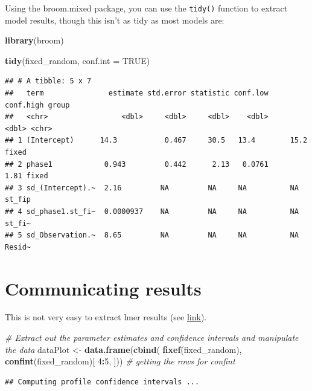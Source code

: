 \documentclass[]{book}
\newenvironment{Shaded}{\begin{snugshade}}{\end{snugshade}}
\newcommand{\KeywordTok}[1]{\textcolor[rgb]{0.13,0.29,0.53}{\textbf{#1}}}
\newcommand{\DataTypeTok}[1]{\textcolor[rgb]{0.13,0.29,0.53}{#1}}
\newcommand{\DecValTok}[1]{\textcolor[rgb]{0.00,0.00,0.81}{#1}}
\newcommand{\StringTok}[1]{\textcolor[rgb]{0.31,0.60,0.02}{#1}}
\newcommand{\CommentTok}[1]{\textcolor[rgb]{0.56,0.35,0.01}{\textit{#1}}}
\newcommand{\OtherTok}[1]{\textcolor[rgb]{0.56,0.35,0.01}{#1}}
\newcommand{\OperatorTok}[1]{\textcolor[rgb]{0.81,0.36,0.00}{\textbf{#1}}}
\newcommand{\NormalTok}[1]{#1}
\begin{document}
Using the broom.mixed package, you can use the \texttt{tidy()} function
to extract model results, though this isn't as tidy as most models are:

\begin{Shaded}
\begin{Highlighting}[]
\KeywordTok{library}\NormalTok{(broom)}

\KeywordTok{tidy}\NormalTok{(fixed_random, }\DataTypeTok{conf.int =} \OtherTok{TRUE}\NormalTok{)}
\end{Highlighting}
\end{Shaded}

\begin{verbatim}
## # A tibble: 5 x 7
##   term               estimate std.error statistic conf.low conf.high group 
##   <chr>                 <dbl>     <dbl>     <dbl>    <dbl>     <dbl> <chr> 
## 1 (Intercept)      14.3           0.467     30.5   13.4        15.2  fixed 
## 2 phase1            0.943         0.442      2.13   0.0761      1.81 fixed 
## 3 sd_(Intercept).~  2.16         NA         NA     NA          NA    st_fip
## 4 sd_phase1.st_fi~  0.0000937    NA         NA     NA          NA    st_fi~
## 5 sd_Observation.~  8.65         NA         NA     NA          NA    Resid~
\end{verbatim}

\section{Communicating results}\label{communicating-results}

This is not very easy to extract lmer results (see
\href{https://github.com/tidymodels/broom/issues/96}{link}).

\begin{Shaded}
\begin{Highlighting}[]
\CommentTok{# Extract out the parameter estimates and confidence intervals and manipulate the data}
\NormalTok{dataPlot <-}\StringTok{ }\KeywordTok{data.frame}\NormalTok{(}\KeywordTok{cbind}\NormalTok{( }\KeywordTok{fixef}\NormalTok{(fixed_random), }\KeywordTok{confint}\NormalTok{(fixed_random)[ }\DecValTok{4}\OperatorTok{:}\DecValTok{5}\NormalTok{, ])) }\CommentTok{# getting the rows for confint}
\end{Highlighting}
\end{Shaded}

\begin{verbatim}
## Computing profile confidence intervals ...
\end{verbatim}
\end{document}
